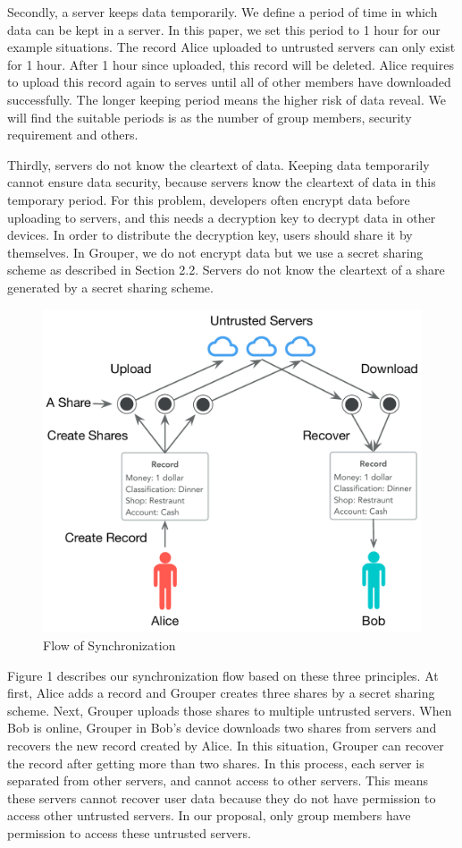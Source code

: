 \documentclass[twocolumn,10pt]{article}
\begin{document}
Secondly, a server keeps data temporarily. We define a period of time in which data can be kept in a server. In this paper, we set this period to 1 hour for our example situations. The record Alice uploaded to untrusted servers can only exist for 1 hour. After 1 hour since uploaded, this record will be deleted. Alice requires to upload this record again to serves until all of other members have downloaded successfully. The longer keeping period means the higher risk of data reveal. We will find the suitable periods is as the number of group members, security requirement and others. 

Thirdly, servers do not know the cleartext of data. Keeping data temporarily cannot ensure data security, because servers know the cleartext of data in this temporary period. For this problem, developers often encrypt data before uploading to servers, and this needs a decryption key to decrypt data in other devices. In order to distribute the decryption key, users should share it by themselves. In Grouper, we do not encrypt data but we use a secret sharing scheme as described in Section 2.2. Servers do not know the cleartext of a share generated by a secret sharing scheme.

\begin{figure}[t]
\centering
\includegraphics[scale=0.35]{sync_flow}
\caption{Flow of Synchronization}
\end{figure}

Figure 1 describes our synchronization flow based on these three principles. At first, Alice adds a record and Grouper creates three shares by a secret sharing scheme. Next, Grouper uploads those shares to multiple untrusted servers. When Bob is online, Grouper in Bob's device downloads two shares from servers and recovers the new record created by Alice. In this situation, Grouper can recover the record after getting more than two shares. In this process, each server is separated from other servers, and cannot access to other servers. This means these servers cannot recover user data because they do not have permission to access other untrusted servers. In our proposal, only group members have permission to access these untrusted servers.
\end{document}
